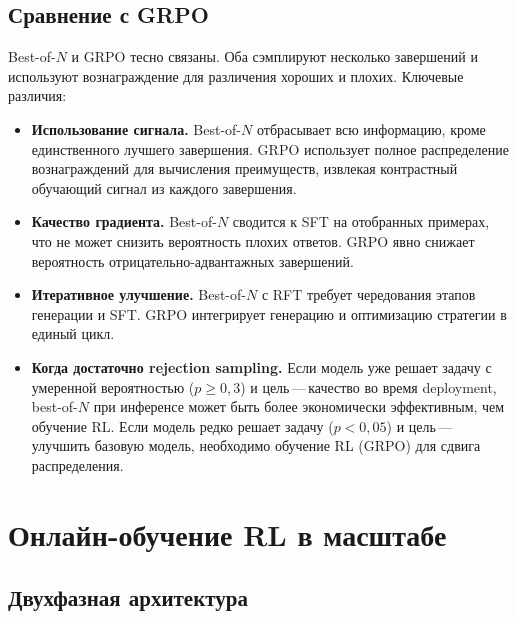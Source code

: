 \subsection{Сравнение с GRPO}

Best-of-$N$ и GRPO тесно связаны. Оба сэмплируют несколько завершений и используют вознаграждение для различения хороших и плохих. Ключевые различия:
\begin{itemize}[leftmargin=*]
  \item \textbf{Использование сигнала.} Best-of-$N$ отбрасывает всю информацию, кроме единственного лучшего завершения. GRPO использует полное распределение вознаграждений для вычисления преимуществ, извлекая контрастный обучающий сигнал из каждого завершения.
  \item \textbf{Качество градиента.} Best-of-$N$ сводится к SFT на отобранных примерах, что не может снизить вероятность плохих ответов. GRPO явно снижает вероятность отрицательно-адвантажных завершений.
  \item \textbf{Итеративное улучшение.} Best-of-$N$ с RFT требует чередования этапов генерации и SFT. GRPO интегрирует генерацию и оптимизацию стратегии в единый цикл.
  \item \textbf{Когда достаточно rejection sampling.} Если модель уже решает задачу с умеренной вероятностью ($p \geq 0{,}3$) и цель\,---\,качество во время deployment, best-of-$N$ при инференсе может быть более экономически эффективным, чем обучение RL. Если модель редко решает задачу ($p < 0{,}05$) и цель\,---\,улучшить базовую модель, необходимо обучение RL (GRPO) для сдвига распределения.
\end{itemize}

\section{Онлайн-обучение RL в масштабе}
\label{sec:grpo-scale}


\subsection{Двухфазная архитектура}

